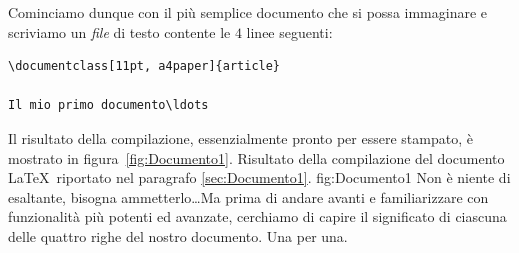 Cominciamo dunque con il pi\`u semplice documento che si possa immaginare
e scriviamo un \emph{file} di testo contente le $4$ linee seguenti:
\begin{verbatim}
\documentclass[11pt, a4paper]{article}

Il mio primo documento\ldots

\end{verbatim}
Il risultato della compilazione, essenzialmente pronto per essere stampato,
\`e mostrato in figura~\ref{fig:Documento1}.
\panelfig
{}
{Risultato della compilazione del documento \LaTeX\ riportato nel
paragrafo \ref{sec:Documento1}.}
{fig:Documento1}
Non \`e niente di esaltante, bisogna ammetterlo\ldots Ma prima di andare
avanti e familiarizzare con funzionalit\`a pi\`u potenti ed avanzate,
cerchiamo di capire il significato di ciascuna delle quattro righe del nostro
documento. Una per una.

